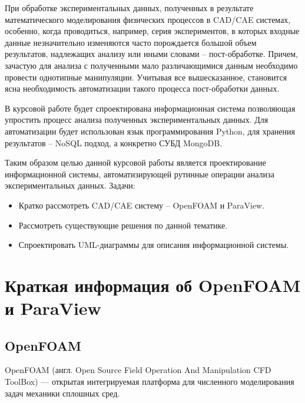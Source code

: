 \documentclass[14pt]{extreport}
\begin{document}



\tableofcontents

\intro

При обработке экспериментальных данных, полученных в результате математического моделирования физических процессов в CAD/CAE системах, особенно, когда проводиться, например, серия экспериментов, в которых входные данные незначительно изменяются часто порождается большой объем результатов, надлежащих анализу или иными словами -- пост-обработке. Причем, зачастую для анализа с полученными мало различающимися данным необходимо провести однотипные манипуляции. Учитывая все вышесказанное, становится ясна необходимость автоматизации такого процесса пост-обработки данных. 

В курсовой работе будет спроектирована информационная система позволяющая упростить процесс анализа полученных экспериментальных данных. Для автоматизации будет использован язык программирования Python, для хранения результатов -- NoSQL подход, а конкретно СУБД MongoDB. 

Таким образом целью данной курсовой работы является проектирование информационной системы, автоматизирующей рутинные операции анализа экспериментальных данных.
Задачи:
\begin{itemize}
\item Кратко рассмотреть CAD/CAE систему -- OpenFOAM и ParaView.
\item Рассмотреть существующие решения по данной тематике.
\item Спроектировать UML-диаграммы для описания информационной системы.
\end{itemize}

\chapter{Краткая информация об OpenFOAM и ParaView}
\section{OpenFOAM}
OpenFOAM (англ. Open Source Field Operation And Manipulation CFD ToolBox) — открытая интегрируемая платформа для численного моделирования задач механики сплошных сред. ~\cite{OpenfoamWiki}
\end{document}
